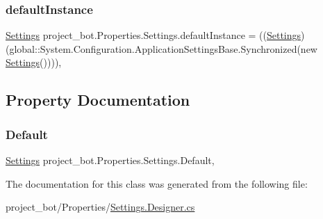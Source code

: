 \subsubsection{\texorpdfstring{default\+Instance}{defaultInstance}}
{\footnotesize\ttfamily \hyperlink{classproject__bot_1_1_properties_1_1_settings}{Settings} project\+\_\+bot.\+Properties.\+Settings.\+default\+Instance = ((\hyperlink{classproject__bot_1_1_properties_1_1_settings}{Settings})(global\+::\+System.\+Configuration.\+Application\+Settings\+Base.\+Synchronized(new \hyperlink{classproject__bot_1_1_properties_1_1_settings}{Settings}())))\hspace{0.3cm}{\ttfamily [static]}, {\ttfamily [private]}}



\subsection{Property Documentation}
\mbox{\label{classproject__bot_1_1_properties_1_1_settings_a1858ac8deefc455ffb3d6f8967420641}} 
\subsubsection{\texorpdfstring{Default}{Default}}
{\footnotesize\ttfamily \hyperlink{classproject__bot_1_1_properties_1_1_settings}{Settings} project\+\_\+bot.\+Properties.\+Settings.\+Default\hspace{0.3cm}{\ttfamily [static]}, {\ttfamily [get]}}



The documentation for this class was generated from the following file\+:\begin{DoxyCompactItemize}
\item 
project\+\_\+bot/\+Properties/\hyperlink{_settings_8_designer_8cs}{Settings.\+Designer.\+cs}\end{DoxyCompactItemize}
